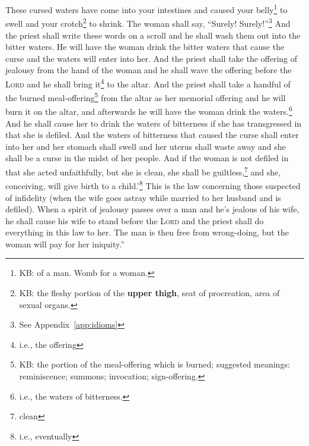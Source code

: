 \begin{inparaenum}
     These cursed waters have come into your intestines and caused your belly\footnote{KB: of a man. Womb for a woman.} to swell and your crotch\footnote{KB: the fleshy portion of the \textbf{upper thigh}, seat of procreation, area of sexual organs.} to shrink. The woman shall say, ``Surely! Surely!''\footnote{See Appendix~\ref{app:idioms}}%
     And the priest shall write these words on a scroll and he shall wash them out into the bitter waters.%
     He will have the woman drink the bitter waters that cause the curse and the waters will enter into her.%
     And the priest shall take the offering of jealousy from the hand of the woman and he shall wave the offering before the \textsc{Lord} and he shall bring it\footnote{i.e., the offering} to the altar.%
     And the priest shall take a handful of the burned meal-offering\footnote{KB: the portion of the meal-offering which is burned; suggested meanings: reminiscence; summons; invocation; sign-offering.} from the altar as her memorial offering and he will burn it on the altar, and afterwards he will have the woman drink the waters.\footnote{i.e., the waters of bitterness.}%
     And he shall cause her to drink the waters of bitterness if she has transgressed in that she is defiled. And the waters of bitterness that caused the curse shall enter into her and her stomach shall swell and her uterus shall waste away and she shall be a curse in the midst of her people.%
     And if the woman is not defiled in that she acted unfaithfully, but she is clean, she shall be guiltless,\footnote{clean} and she, conceiving, will give birth to a child.'\footnote{i.e., eventually}%
     This is the law concerning those suspected of infidelity (when the wife goes astray while married to her husband and is defiled).%
     When a spirit of jealousy passes over a man and he's jealous of his wife, he shall cause his wife to stand before the \textsc{Lord} and the priest shall do everything in this law to her.%
     The man is then free from wrong-doing, but the woman will pay for her iniquity.''%
\end{inparaenum}
